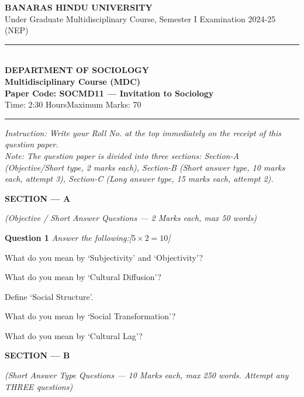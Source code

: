 \documentclass[11pt,a4paper]{article}
\newcommand{\pts}[1]{\hfill   \textit{[#1]}}
\begin{document}
\begin{center}
  {\large\bfseries BANARAS HINDU UNIVERSITY}\\[2pt]
  {\normalsize Under Graduate Multidisciplinary Course, Semester I Examination 2024-25 (NEP)}\\[6pt]
  \rule{0.8\linewidth}{0.5pt}\\[6pt]
  {\large\bfseries DEPARTMENT OF SOCIOLOGY}\\[4pt]
  {\large\bfseries Multidisciplinary Course (MDC)}\\[4pt]
  {\large\bfseries Paper Code: SOCMD11 --- Invitation to Sociology}\\[4pt]
  {\normalsize Time: 2:30 Hours\hfill Maximum Marks: 70}
\end{center}

\rule{\linewidth}{0.4pt}\smallskip



\noindent   \textit{Instruction: Write your Roll No. at the top immediately on the receipt of this question paper.}\\[2pt]



\noindent   \textit{Note: The question paper is divided into three sections: Section-A (Objective/Short type, 2 marks each), Section-B (Short answer type, 10 marks each, attempt 3), Section-C (Long answer type, 15 marks each, attempt 2).}
\bigskip


\begin{center}
   \textbf{\large SECTION --- A}
\end{center}
   \textit{(Objective / Short Answer Questions --- 2 Marks each, max 50 words)}
\bigskip




\noindent   \textbf{Question 1}   \textit{Answer the following:}\pts{$5  \times 2 = 10$}

\begin{parts}
  \item What do you mean by `Subjectivity' and `Objectivity'?
  \item What do you mean by `Cultural Diffusion'?
  \item Define `Social Structure'.
  \item What do you mean by `Social Transformation'?
  \item What do you mean by `Cultural Lag'?
\end{parts}

\bigskip

\begin{center}
   \textbf{\large SECTION --- B}
\end{center}
   \textit{(Short Answer Type Questions --- 10 Marks each, max 250 words. Attempt any THREE questions)}
\bigskip
\end{document}
